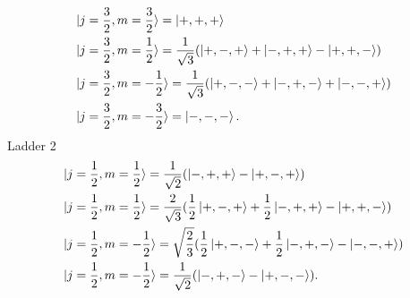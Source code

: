 \begin{example}
\begin{equation}
		\begin{split}
			&\ket{j=\frac{3}{2},m=\frac{3}{2}}=\ket{+,+,+}\\
			&\ket{j=\frac{3}{2},m=\frac{1}{2}}=\frac{1}{\sqrt{3}}(\ket{+,-,+}+\ket{-,+,+}-\ket{+,+,-})\\
			&\ket{j=\frac{3}{2},m=-\frac{1}{2}}=\frac{1}{\sqrt{3}}(\ket{+,-,-}+\ket{-,+,-}+\ket{-,-,+})\\
			&\ket{j=\frac{3}{2},m=-\frac{3}{2}}=\ket{-,-,-}.
		\end{split}
	\end{equation} 
	Ladder 2
	\begin{equation}
		\begin{split}
			&\ket{j=\frac{1}{2},m=\frac{1}{2}}=\frac{1}{\sqrt{2}}(\ket{-,+,+}-\ket{+,-,+})\\
			&\ket{j=\frac{1}{2},m=\frac{1}{2}}=\frac{2}{\sqrt{3}}(\frac{1}{2}\ket{+,-,+}+\frac{1}{2}\ket{-,+,+}-\ket{+,+,-})\\
			&\ket{j=\frac{1}{2},m=-\frac{1}{2}}=\sqrt{\frac{2}{3}}(\frac{1}{2}\ket{+,-,-}+\frac{1}{2}\ket{-,+,-}-\ket{-,-,+})\\
			&\ket{j=\frac{1}{2},m=-\frac{1}{2}}=\frac{1}{\sqrt{2}}(\ket{-,+,-}-\ket{+,-,-}).\\
		\end{split}
	\end{equation} 
\end{example}

